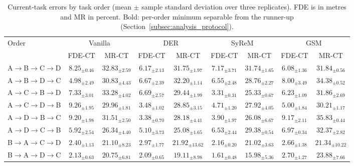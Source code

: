 \begin{table}[!t]
\centering
\caption{Current-task errors by task order (mean $\pm$ sample standard deviation over three replicates). FDE is in metres and MR in percent. Bold: per-order minimum separable from the runner-up (Section~\ref{subsec:analysis_protocol}).}
\label{tab:main_results_plasticity}
\setlength{\tabcolsep}{3.5pt}
\renewcommand{\arraystretch}{1.0}
\fontsize{7}{7.7}\selectfont
\begin{tabular*}{\textwidth}{@{\extracolsep{\fill}}lcccccccc}
\toprule
Order & \multicolumn{2}{c}{Vanilla} & \multicolumn{2}{c}{DER} & \multicolumn{2}{c}{SyReM} & \multicolumn{2}{c}{GSM} \\
\cmidrule(lr){2-3}\cmidrule(lr){4-5}\cmidrule(lr){6-7}\cmidrule(lr){8-9}
 & FDE-CT & MR-CT & FDE-CT & MR-CT & FDE-CT & MR-CT & FDE-CT & MR-CT \\
\midrule
A$\to$B$\to$C$\to$D & $8.25_{\pm0.46}$ & $32.83_{\pm2.59}$ & $6.17_{\pm2.13}$ & $31.75_{\pm1.97}$ & $7.17_{\pm3.71}$ & $31.74_{\pm1.65}$ & $6.08_{\pm1.36}$ & $31.84_{\pm0.56}$ \\
A$\to$B$\to$D$\to$C & $4.98_{\pm2.49}$ & $30.83_{\pm4.43}$ & $6.67_{\pm2.39}$ & $32.20_{\pm1.14}$ & $6.55_{\pm2.48}$ & $28.76_{\pm2.27}$ & $8.00_{\pm3.49}$ & $34.38_{\pm0.52}$ \\
A$\to$C$\to$B$\to$D & $7.33_{\pm3.01}$ & $33.28_{\pm4.02}$ & $6.69_{\pm2.57}$ & $29.44_{\pm1.99}$ & {\boldmath$3.31_{\pm0.31}$} & {\boldmath$25.33_{\pm0.67}$} & $6.23_{\pm1.09}$ & $31.86_{\pm2.69}$ \\
A$\to$C$\to$D$\to$B & $9.26_{\pm1.95}$ & $29.96_{\pm1.81}$ & {\boldmath$3.48_{\pm1.02}$} & $28.85_{\pm3.15}$ & $4.71_{\pm1.20}$ & $27.92_{\pm4.05}$ & $5.00_{\pm1.84}$ & $30.21_{\pm1.17}$ \\
A$\to$D$\to$B$\to$C & $9.20_{\pm1.98}$ & $31.51_{\pm2.50}$ & $3.38_{\pm0.70}$ & $28.18_{\pm4.41}$ & $3.90_{\pm1.97}$ & $26.08_{\pm6.67}$ & $9.17_{\pm2.11}$ & $35.83_{\pm0.44}$ \\
A$\to$D$\to$C$\to$B & $5.92_{\pm2.54}$ & $26.34_{\pm4.40}$ & $5.10_{\pm3.73}$ & $25.08_{\pm1.65}$ & $6.53_{\pm2.44}$ & $29.38_{\pm0.54}$ & $6.97_{\pm0.34}$ & $32.37_{\pm2.82}$ \\
B$\to$A$\to$C$\to$D & $2.40_{\pm1.13}$ & $21.10_{\pm8.23}$ & $2.97_{\pm1.77}$ & $21.92_{\pm13.62}$ & $2.16_{\pm0.20}$ & $21.02_{\pm3.63}$ & $2.66_{\pm1.38}$ & $21.34_{\pm10.22}$ \\
B$\to$A$\to$D$\to$C & $2.13_{\pm0.63}$ & $20.75_{\pm6.81}$ & $2.09_{\pm0.65}$ & $19.11_{\pm8.98}$ & $1.61_{\pm0.48}$ & $15.98_{\pm5.36}$ & $2.70_{\pm1.27}$ & $23.88_{\pm7.66}$ \\

\end{tabular*}
\end{table}
